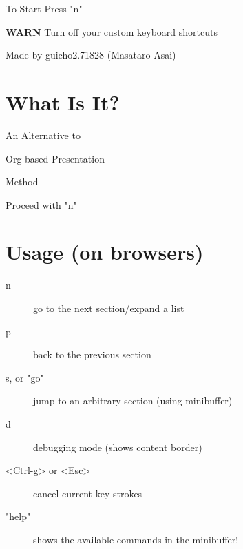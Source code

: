 \begin{outline-text-1}
\begin{xlarge}
\begin{center}
To Start Press "n"
\end{center}
\end{xlarge}

\begin{center}
\textbf{WARN} Turn off your custom keyboard shortcuts
\end{center}

\begin{note}
\begin{alignright}
Made by guicho2.71828 (Masataro Asai)
\end{alignright}
\end{note}
\end{outline-text-1}

\section{What Is It?}
\label{sec-1}

\begin{xlarge}
An Alternative to
\begin{center}
Org-based Presentation
\end{center}
\begin{alignright}
Method
\end{alignright}
\end{xlarge}

\begin{center}
Proceed with "n"
\end{center}

\section{Usage (on browsers)}
\label{sec-2}

\begin{smaller}
\begin{description}
\item[{n}] go to the next section/expand a list
\item[{p}] back to the previous section
\item[{s, or "go"}] jump to an arbitrary section (using minibuffer)
\item[{d}] debugging mode (shows content border)
\item[{<Ctrl-g> or <Esc>}] cancel current key strokes
\item[{"help"}] shows the available commands in the minibuffer!
\end{description}
\end{smaller}

